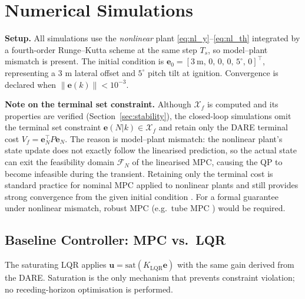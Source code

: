 \documentclass[11pt,a4paper]{article}
\newcommand{\vect}[1]{\bm{#1}}
\newcommand{\xf}{\mathcal{X}_f}
\newcommand{\norm}[1]{\left\lVert #1 \right\rVert}
\begin{document}
\section{Numerical Simulations}
\label{sec:sims}

\textbf{Setup.}
All simulations use the \emph{nonlinear} plant \eqref{eq:nl_y}--\eqref{eq:nl_th}
integrated by a fourth-order Runge--Kutta scheme at the same step $T_s$,
so model--plant mismatch is present.  The initial condition is
$\vect{e}_0 = [3\ \mathrm{m},\, 0,\, 0,\, 0,\, 5^{\circ},\, 0]^\top$, representing a
3 m lateral offset and $5^{\circ}$ pitch tilt at ignition.  Convergence is declared
when $\norm{\vect{e}(k)} < 10^{-3}$.

\textbf{Note on the terminal set constraint.}
Although $\xf$ is computed and its properties are verified (Section~\ref{sec:stability}),
the closed-loop simulations omit the terminal set constraint $\vect{e}(N|k) \in \xf$
and retain only the DARE terminal cost $V_f = \vect{e}_N^\top P\vect{e}_N$.
The reason is model--plant mismatch: the nonlinear plant's state update does not
exactly follow the linearised prediction, so the actual state can exit the
feasibility domain $\mathcal{F}_N$ of the linearised MPC, causing the QP to
become infeasible during the transient.  Retaining only the terminal cost is
standard practice for nominal MPC applied to nonlinear plants and still provides
strong convergence from the given initial condition
\cite[Remark~2.21]{RawlingsMayne2017}.
For a formal guarantee under nonlinear mismatch, robust MPC (e.g.\ tube MPC
\cite{Mayne2011}) would be required.

\subsection{Baseline Controller: MPC vs.\ LQR}

The saturating LQR applies $\vect{u} = \mathrm{sat}(K_{\mathrm{LQR}}\vect{e})$
with the same gain derived from the DARE.  Saturation is the only mechanism that
prevents constraint violation; no receding-horizon optimisation is performed.
\end{document}
